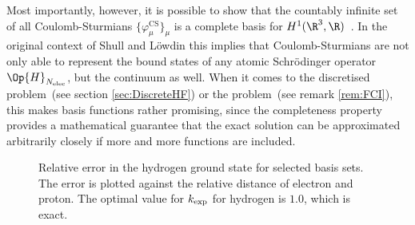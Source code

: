 Most importantly, however, it is possible to show
that the countably infinite set of all Coulomb-Sturmians $\{\varphi^\text{CS}_\mu\}_{\mu}$
is a complete basis for $H^1(\R^3, \R)$~\cite[Theorem 2.3.4]{Avery2008}.
In the original context of Shull and Löwdin this implies that Coulomb-Sturmians
are not only able to represent the bound states
of any atomic Schrödinger operator $\Op{H}_{\Nelec}$,
but the continuum as well.
When it comes to the discretised \HF problem~(see section \ref{sec:DiscreteHF})
or the \FCI problem~(see remark \ref{rem:FCI}),
this makes \CS basis functions rather promising,
since the completeness property
provides a mathematical guarantee that the exact solution can be approximated
arbitrarily closely
if more and more \CS functions are included.

\begin{figure}[t]
	\centering
	\caption[
		Relative error in the hydrogen \HF ground state
		for selected \CS basis sets.
	]
	{Relative error in the hydrogen \HF ground state
		for selected \CS basis sets.
		The error is plotted against
		the relative distance of electron and proton.
		The optimal value for $k_\text{exp}$ for hydrogen is $1.0$,
		which is exact.
	}
	\label{fig:RelativeErrorCS}
\end{figure}

